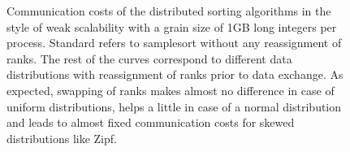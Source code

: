 \begin{figure}
\caption{\label{fig:comm} Communication costs of the distributed sorting algorithms in the style of weak scalability with a grain size of 1GB long integers per process. Standard refers to samplesort without any reassignment of ranks. The rest of the curves correspond to different data distributions with reassignment of ranks prior to data exchange. As expected, swapping of ranks makes almost no difference in case of uniform distributions, helps a little in case of a normal distribution and leads to almost fixed communication costs for skewed distributions like Zipf.}
\end{figure}
